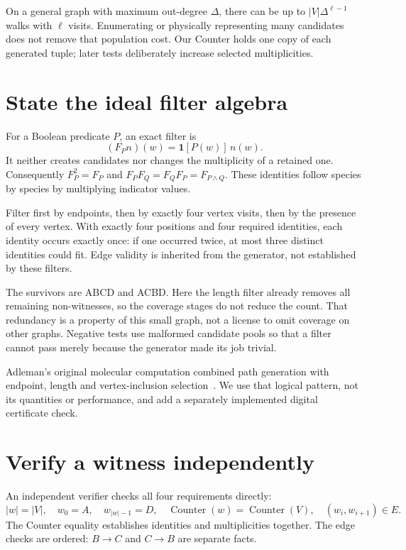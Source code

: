On a general graph with maximum out-degree $\Delta$, there can be up to
$|V|\Delta^{\ell-1}$ walks with $\ell$ visits. Enumerating or physically
representing many candidates does not remove that population cost.
Our Counter holds one copy of each generated tuple; later tests deliberately
increase selected multiplicities.

\section{State the ideal filter algebra}
For a Boolean predicate $P$, an exact filter is
\begin{equation}
 (F_Pn)(w)=\mathbf1[P(w)]\,n(w).
\end{equation}
It neither creates candidates nor changes the multiplicity of a retained one.
Consequently $F_P^2=F_P$ and $F_PF_Q=F_QF_P=F_{P\land Q}$.
These identities follow species by species by multiplying indicator values.

Filter first by endpoints, then by exactly four vertex visits, then by
the presence of every vertex. With exactly four positions and four required
identities, each identity occurs exactly once: if one occurred twice,
at most three distinct identities could fit. Edge validity is inherited
from the generator, not established by these filters.
\begin{center}\end{center}
The survivors are ABCD and ACBD. Here the length filter already removes all
remaining non-witnesses, so the coverage stages do not reduce the count.
That redundancy is a property of this small graph, not a license to omit
coverage on other graphs. Negative tests use malformed candidate pools so
that a filter cannot pass merely because the generator made its job trivial.

Adleman's original molecular computation combined path generation with
endpoint, length and vertex-inclusion selection~\cite{adleman}. We use that
logical pattern, not its quantities or performance, and add a separately
implemented digital certificate check.

\section{Verify a witness independently}
An independent verifier checks all four requirements directly:
\begin{equation}
 |w|=|V|,\quad w_0=A,\quad w_{|w|-1}=D,\quad
 \operatorname{Counter}(w)=\operatorname{Counter}(V),\quad
 (w_i,w_{i+1})\in E.
\end{equation}
The Counter equality establishes identities and multiplicities together.
The edge checks are ordered: $B\to C$ and $C\to B$ are separate facts.

